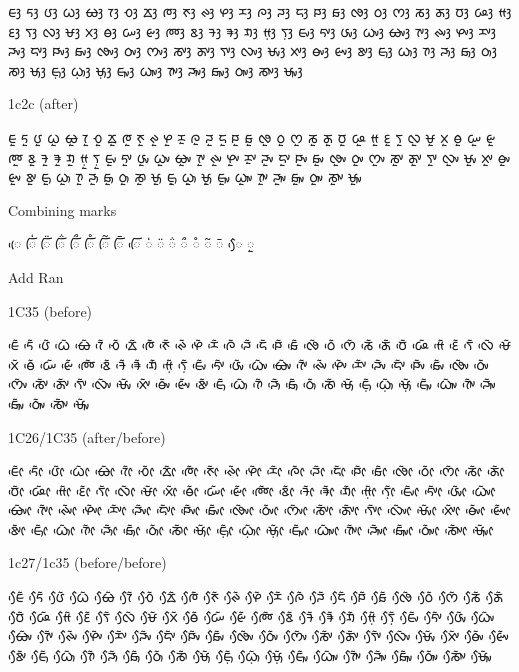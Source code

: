 \noindent
ᰀᰫ ᰁᰫ ᰂᰫ ᰃᰫ ᰄᰫ ᰅᰫ ᰆᰫ ᰇᰫ ᰈᰫ ᰉᰫ ᰊᰫ ᰋᰫ ᰌᰫ ᰍᰫ ᰎᰫ ᰏᰫ ᰐᰫ ᰑᰫ ᰒᰫ ᰓᰫ ᰔᰫ ᰕᰫ ᰖᰫ ᰗᰫ ᰘᰫ ᰙᰫ ᰚᰫ ᰛᰫ ᰜᰫ ᰝᰫ ᰞᰫ ᰟᰫ ᰠᰫ ᰡᰫ ᰢᰫ ᰣᰫ ᱍᰫ ᱎᰫ ᱏᰫ ᰙ᰷ᰫ ᰛ᰷ᰫ ᰀᰤᰫ ᰁᰤᰫ ᰂᰤᰫ ᰃᰤᰫ ᰄᰤᰫ ᰅᰤᰫ ᰊᰤᰫ ᰋᰤᰫ ᰌᰤᰫ ᰎᰤᰫ ᰏᰤᰫ ᰐᰤᰫ ᰑᰤᰫ ᰒᰤᰫ ᰓᰤᰫ ᰔᰤᰫ ᰕᰤᰫ ᰖᰤᰫ ᰛᰤᰫ ᰜᰤᰫ ᰝᰤᰫ ᰞᰤᰫ ᰟᰤᰫ ᰡᰤᰫ ᰣᰤᰫ ᰀᰥᰫ ᰃᰥᰫ ᰅᰥᰫ ᰎᰥᰫ ᰑᰥᰫ ᰓᰥᰫ ᰕᰥᰫ ᰝᰥᰫ ᰀ᰷ᰥᰫ ᰃ᰷ᰥᰫ ᰝ᰷ᰥᰫ ᰀᰥᰤᰫ ᰃᰥᰤᰫ ᰅᰥᰤᰫ ᰎᰥᰤᰫ ᰑᰥᰤᰫ ᰓᰥᰤᰫ ᰕᰥᰤᰫ ᰝᰥᰤᰫ 

\noindent
1c2c (after)

\noindent
ᰀᰬ ᰁᰬ ᰂᰬ ᰃᰬ ᰄᰬ ᰅᰬ ᰆᰬ ᰇᰬ ᰈᰬ ᰉᰬ ᰊᰬ ᰋᰬ ᰌᰬ ᰍᰬ ᰎᰬ ᰏᰬ ᰐᰬ ᰑᰬ ᰒᰬ ᰓᰬ ᰔᰬ ᰕᰬ ᰖᰬ ᰗᰬ ᰘᰬ ᰙᰬ ᰚᰬ ᰛᰬ ᰜᰬ ᰝᰬ ᰞᰬ ᰟᰬ ᰠᰬ ᰡᰬ ᰢᰬ ᰣᰬ ᱍᰬ ᱎᰬ ᱏᰬ ᰙ᰷ᰬ ᰛ᰷ᰬ ᰀᰤᰬ ᰁᰤᰬ ᰂᰤᰬ ᰃᰤᰬ ᰄᰤᰬ ᰅᰤᰬ ᰊᰤᰬ ᰋᰤᰬ ᰌᰤᰬ ᰎᰤᰬ ᰏᰤᰬ ᰐᰤᰬ ᰑᰤᰬ ᰒᰤᰬ ᰓᰤᰬ ᰔᰤᰬ ᰕᰤᰬ ᰖᰤᰬ ᰛᰤᰬ ᰜᰤᰬ ᰝᰤᰬ ᰞᰤᰬ ᰟᰤᰬ ᰡᰤᰬ ᰣᰤᰬ ᰀᰥᰬ ᰃᰥᰬ ᰅᰥᰬ ᰎᰥᰬ ᰑᰥᰬ ᰓᰥᰬ ᰕᰥᰬ ᰝᰥᰬ ᰀ᰷ᰥᰬ ᰃ᰷ᰥᰬ ᰝ᰷ᰥᰬ ᰀᰥᰤᰬ ᰃᰥᰤᰬ ᰅᰥᰤᰬ ᰎᰥᰤᰬ ᰑᰥᰤᰬ ᰓᰥᰤᰬ ᰕᰥᰤᰬ ᰝᰥᰤᰬ 

\noindent
Combining marks

\noindent
◌ᰨᰵ ◌ᰩᰭ ◌ᰩᰮ ◌ᰩᰯ ◌ᰩᰰ ◌ᰩᰱ ◌ᰩᰲ ◌ᰩᰳ ◌ᰩᰵ 
\noindent
◌ᰭ ◌ᰮ ◌ᰯ ◌ᰰ ◌ᰱ ◌ᰲ ◌ᰳ ◌ᰧᰵ ◌ᰬ

\noindent
Add Ran

\noindent
1C35 (before)

\noindent
ᰀᰵᰶ ᰁᰵᰶ ᰂᰵᰶ ᰃᰵᰶ ᰄᰵᰶ ᰅᰵᰶ ᰆᰵᰶ ᰇᰵᰶ ᰈᰵᰶ ᰉᰵᰶ ᰊᰵᰶ ᰋᰵᰶ ᰌᰵᰶ ᰍᰵᰶ ᰎᰵᰶ ᰏᰵᰶ ᰐᰵᰶ ᰑᰵᰶ ᰒᰵᰶ ᰓᰵᰶ ᰔᰵᰶ ᰕᰵᰶ ᰖᰵᰶ ᰗᰵᰶ ᰘᰵᰶ ᰙᰵᰶ ᰚᰵᰶ ᰛᰵᰶ ᰜᰵᰶ ᰝᰵᰶ ᰞᰵᰶ ᰟᰵᰶ ᰠᰵᰶ ᰡᰵᰶ ᰢᰵᰶ ᰣᰵᰶ ᱍᰵᰶ ᱎᰵᰶ ᱏᰵᰶ ᰙ᰷ᰵᰶ ᰛ᰷ᰵᰶ ᰀᰤᰵᰶ ᰁᰤᰵᰶ ᰂᰤᰵᰶ ᰃᰤᰵᰶ ᰄᰤᰵᰶ ᰅᰤᰵᰶ ᰊᰤᰵᰶ ᰋᰤᰵᰶ ᰌᰤᰵᰶ ᰎᰤᰵᰶ ᰏᰤᰵᰶ ᰐᰤᰵᰶ ᰑᰤᰵᰶ ᰒᰤᰵᰶ ᰓᰤᰵᰶ ᰔᰤᰵᰶ ᰕᰤᰵᰶ ᰖᰤᰵᰶ ᰛᰤᰵᰶ ᰜᰤᰵᰶ ᰝᰤᰵᰶ ᰞᰤᰵᰶ ᰟᰤᰵᰶ ᰡᰤᰵᰶ ᰣᰤᰵᰶ ᰀᰥᰵᰶ ᰃᰥᰵᰶ ᰅᰥᰵᰶ ᰎᰥᰵᰶ ᰑᰥᰵᰶ ᰓᰥᰵᰶ ᰕᰥᰵᰶ ᰝᰥᰵᰶ ᰀ᰷ᰥᰵᰶ ᰃ᰷ᰥᰵᰶ ᰝ᰷ᰥᰵᰶ ᰀᰥᰤᰵᰶ ᰃᰥᰤᰵᰶ ᰅᰥᰤᰵᰶ ᰎᰥᰤᰵᰶ ᰑᰥᰤᰵᰶ ᰓᰥᰤᰵᰶ ᰕᰥᰤᰵᰶ ᰝᰥᰤᰵᰶ 

\noindent
1C26/1C35 (after/before)

\noindent
ᰀᰦᰵᰶ ᰁᰦᰵᰶ ᰂᰦᰵᰶ ᰃᰦᰵᰶ ᰄᰦᰵᰶ ᰅᰦᰵᰶ ᰆᰦᰵᰶ ᰇᰦᰵᰶ ᰈᰦᰵᰶ ᰉᰦᰵᰶ ᰊᰦᰵᰶ ᰋᰦᰵᰶ ᰌᰦᰵᰶ ᰍᰦᰵᰶ ᰎᰦᰵᰶ ᰏᰦᰵᰶ ᰐᰦᰵᰶ ᰑᰦᰵᰶ ᰒᰦᰵᰶ ᰓᰦᰵᰶ ᰔᰦᰵᰶ ᰕᰦᰵᰶ ᰖᰦᰵᰶ ᰗᰦᰵᰶ ᰘᰦᰵᰶ ᰙᰦᰵᰶ ᰚᰦᰵᰶ ᰛᰦᰵᰶ ᰜᰦᰵᰶ ᰝᰦᰵᰶ ᰞᰦᰵᰶ ᰟᰦᰵᰶ ᰠᰦᰵᰶ ᰡᰦᰵᰶ ᰢᰦᰵᰶ ᰣᰦᰵᰶ ᱍᰦᰵᰶ ᱎᰦᰵᰶ ᱏᰦᰵᰶ ᰙ᰷ᰦᰵᰶ ᰛ᰷ᰦᰵᰶ ᰀᰤᰦᰵᰶ ᰁᰤᰦᰵᰶ ᰂᰤᰦᰵᰶ ᰃᰤᰦᰵᰶ ᰄᰤᰦᰵᰶ ᰅᰤᰦᰵᰶ ᰊᰤᰦᰵᰶ ᰋᰤᰦᰵᰶ ᰌᰤᰦᰵᰶ ᰎᰤᰦᰵᰶ ᰏᰤᰦᰵᰶ ᰐᰤᰦᰵᰶ ᰑᰤᰦᰵᰶ ᰒᰤᰦᰵᰶ ᰓᰤᰦᰵᰶ ᰔᰤᰦᰵᰶ ᰕᰤᰦᰵᰶ ᰖᰤᰦᰵᰶ ᰛᰤᰦᰵᰶ ᰜᰤᰦᰵᰶ ᰝᰤᰦᰵᰶ ᰞᰤᰦᰵᰶ ᰟᰤᰦᰵᰶ ᰡᰤᰦᰵᰶ ᰣᰤᰦᰵᰶ ᰀᰥᰦᰵᰶ ᰃᰥᰦᰵᰶ ᰅᰥᰦᰵᰶ ᰎᰥᰦᰵᰶ ᰑᰥᰦᰵᰶ ᰓᰥᰦᰵᰶ ᰕᰥᰦᰵᰶ ᰝᰥᰦᰵᰶ ᰀ᰷ᰥᰦᰵᰶ ᰃ᰷ᰥᰦᰵᰶ ᰝ᰷ᰥᰦᰵᰶ ᰀᰥᰤᰦᰵᰶ ᰃᰥᰤᰦᰵᰶ ᰅᰥᰤᰦᰵᰶ ᰎᰥᰤᰦᰵᰶ ᰑᰥᰤᰦᰵᰶ ᰓᰥᰤᰦᰵᰶ ᰕᰥᰤᰦᰵᰶ ᰝᰥᰤᰦᰵᰶ 

\noindent
1c27/1c35 (before/before)

\noindent
ᰀᰧᰵᰶ ᰁᰧᰵᰶ ᰂᰧᰵᰶ ᰃᰧᰵᰶ ᰄᰧᰵᰶ ᰅᰧᰵᰶ ᰆᰧᰵᰶ ᰇᰧᰵᰶ ᰈᰧᰵᰶ ᰉᰧᰵᰶ ᰊᰧᰵᰶ ᰋᰧᰵᰶ ᰌᰧᰵᰶ ᰍᰧᰵᰶ ᰎᰧᰵᰶ ᰏᰧᰵᰶ ᰐᰧᰵᰶ ᰑᰧᰵᰶ ᰒᰧᰵᰶ ᰓᰧᰵᰶ ᰔᰧᰵᰶ ᰕᰧᰵᰶ ᰖᰧᰵᰶ ᰗᰧᰵᰶ ᰘᰧᰵᰶ ᰙᰧᰵᰶ ᰚᰧᰵᰶ ᰛᰧᰵᰶ ᰜᰧᰵᰶ ᰝᰧᰵᰶ ᰞᰧᰵᰶ ᰟᰧᰵᰶ ᰠᰧᰵᰶ ᰡᰧᰵᰶ ᰢᰧᰵᰶ ᰣᰧᰵᰶ ᱍᰧᰵᰶ ᱎᰧᰵᰶ ᱏᰧᰵᰶ ᰙ᰷ᰧᰵᰶ ᰛ᰷ᰧᰵᰶ ᰀᰤᰧᰵᰶ ᰁᰤᰧᰵᰶ ᰂᰤᰧᰵᰶ ᰃᰤᰧᰵᰶ ᰄᰤᰧᰵᰶ ᰅᰤᰧᰵᰶ ᰊᰤᰧᰵᰶ ᰋᰤᰧᰵᰶ ᰌᰤᰧᰵᰶ ᰎᰤᰧᰵᰶ ᰏᰤᰧᰵᰶ ᰐᰤᰧᰵᰶ ᰑᰤᰧᰵᰶ ᰒᰤᰧᰵᰶ ᰓᰤᰧᰵᰶ ᰔᰤᰧᰵᰶ ᰕᰤᰧᰵᰶ ᰖᰤᰧᰵᰶ ᰛᰤᰧᰵᰶ ᰜᰤᰧᰵᰶ ᰝᰤᰧᰵᰶ ᰞᰤᰧᰵᰶ ᰟᰤᰧᰵᰶ ᰡᰤᰧᰵᰶ ᰣᰤᰧᰵᰶ ᰀᰥᰧᰵᰶ ᰃᰥᰧᰵᰶ ᰅᰥᰧᰵᰶ ᰎᰥᰧᰵᰶ ᰑᰥᰧᰵᰶ ᰓᰥᰧᰵᰶ ᰕᰥᰧᰵᰶ ᰝᰥᰧᰵᰶ ᰀ᰷ᰥᰧᰵᰶ ᰃ᰷ᰥᰧᰵᰶ ᰝ᰷ᰥᰧᰵᰶ ᰀᰥᰤᰧᰵᰶ ᰃᰥᰤᰧᰵᰶ ᰅᰥᰤᰧᰵᰶ ᰎᰥᰤᰧᰵᰶ ᰑᰥᰤᰧᰵᰶ ᰓᰥᰤᰧᰵᰶ ᰕᰥᰤᰧᰵᰶ ᰝᰥᰤᰧᰵᰶ 

